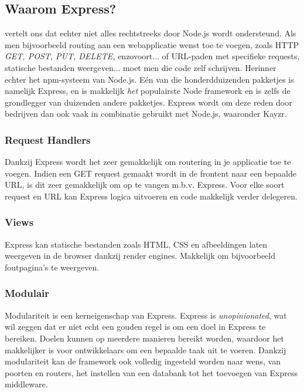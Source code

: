 \subsection{Waarom Express?}
\label{sec:whyExpress}

\textcite{ExpressMozilla} vertelt ons dat echter niet alles rechtstreeks door Node.js wordt ondersteund. Als men bijvoorbeeld routing aan een webapplicatie wenst toe te voegen, zoals HTTP \textsl{GET, POST, PUT, DELETE,} enzovoort... of URL-paden met specifieke requests, statische bestanden weergeven... moet men die code zelf schrijven. Herinner echter het npm-systeem van Node.js. Eén van die honderdduizenden pakketjes is namelijk Express, en is makkelijk \textit{het} populairste Node framework en is zelfs de grondlegger van duizenden andere pakketjes. Express wordt om deze reden door bedrijven dan ook vaak in combinatie gebruikt met Node.js, waaronder Kayzr. 

\subsubsection{Request Handlers}
\label{sec:reqHandlers}

Dankzij Express wordt het zeer gemakkelijk om routering in je applicatie toe te voegen. Indien een GET request gemaakt wordt in de frontent naar een bepaalde URL, is dit zeer gemakkelijk om op te vangen m.b.v. Express. Voor elke soort request en URL kan Express logica uitvoeren en code makkelijk verder delegeren.

\subsubsection{Views}
\label{sec:expressViews}

Express kan statische bestanden zoals HTML, CSS en afbeeldingen laten weergeven in de browser dankzij render engines. Makkelijk om bijvoorbeeld foutpagina's te weergeven.

\subsubsection{Modulair}
\label{sec:expressModularity}

Modulariteit is een kerneigenschap van Express. Express is \textit{unopinionated}, wat wil zeggen dat er niet echt een gouden regel is om een doel in Express te bereiken. Doelen kunnen op meerdere manieren bereikt worden, waardoor het makkelijker is voor ontwikkelaars om een bepaalde taak uit te voeren. Dankzij modulariteit kan de framework ook volledig ingesteld worden naar wens, van poorten en routers, het instellen van een databank tot het toevoegen van Express middleware. 

